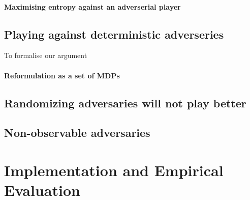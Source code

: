 \documentclass[conference]{IEEEtran}
\theoremstyle{remark}
\begin{document}
\paragraph{Maximising entropy against an adverserial player}

\subsection{Playing against deterministic adverseries}
To formalise our argument
\paragraph{Reformulation as a set of MDPs}

\paragraph{}


\subsection{Randomizing adversaries will not play better}

\subsection{Non-observable adversaries}

\section{Implementation and Empirical Evaluation}




\end{document}
